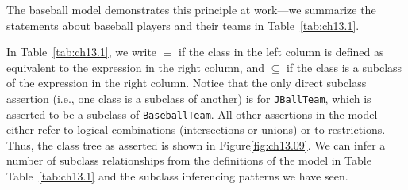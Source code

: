 The baseball model demonstrates this principle at work---we summarize
the statements about baseball players and their teams in Table~\ref{tab:ch13.1}.

In Table~\ref{tab:ch13.1}, we write $\equiv$ if the class in the left column is defined as
equivalent to the expression in the
right column, and $\subseteq$ if the class is a subclass of the expression in the
right column. Notice that the only direct subclass assertion (i.e., one
class is a subclass of another) is for \texttt{JBallTeam}, which is asserted to
be a subclass of \texttt{BaseballTeam}. All other assertions in the model either
refer to logical combinations (intersections or unions) or to
restrictions. Thus, the class tree as asserted is shown in Figure\ref{fig:ch13.09}.
We can infer a number of subclass relationships from the definitions of
the model in Table Table~\ref{tab:ch13.1} and the subclass inferencing patterns we have
seen.

